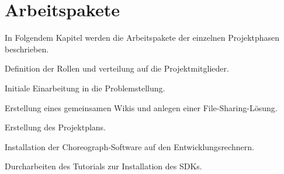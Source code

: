 
\chapter{Arbeitspakete}

    In Folgendem Kapitel werden die Arbeitspakete der einzelnen Projektphasen
    beschrieben.

    {
        Definition der Rollen und verteilung auf die Projektmitglieder.
    }

    {
        Initiale Einarbeitung in die Problemstellung.
    }

    {
        Erstellung eines gemeinsamen Wikis und anlegen einer
        File-Sharing-Lösung.
    }

    {
        Erstellung des Projektplans.
    }

    {
        Installation der Choreograph-Software auf den Entwicklungsrechnern.
    }

    {
        Durcharbeiten des Tutorials zur Installation des SDKs.
    }

    {
    }

    {
    }

    {
    }

